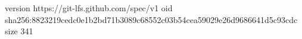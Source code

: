 version https://git-lfs.github.com/spec/v1
oid sha256:8823219cedc0e1b2bd71b3089c68552c03b54cea59029e26d9686641d5c93cdc
size 341

